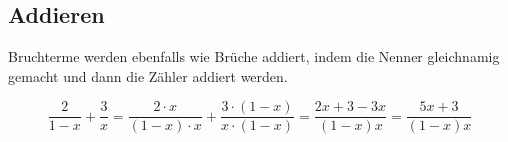 \documentclass[parskip=half]{scrartcl}
\begin{document}
  \subsection*{Addieren}
  Bruchterme werden ebenfalls wie Brüche addiert, indem die Nenner gleichnamig gemacht und dann die Zähler addiert werden.
  \begin{example}
    \[
      \frac{2}{1-x}+ \frac{3}{x} = \frac{2\cdot x}{(1-x)\cdot x}+\frac{3\cdot (1-x)}{x\cdot (1-x)} = \frac{2x+3-3x}{(1-x)x} = \frac{5x+3}{(1-x)x}
    \]
  \end{example}
\end{document}
